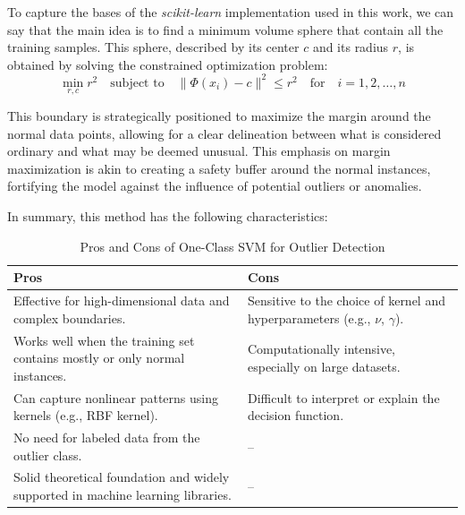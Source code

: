 \documentclass[11pt,english,a4paper,hidelinks]{book}
\begin{document}
\vspace{0.5cm}
\noindent To capture the bases of the \textit{scikit-learn} implementation \cite{scikit2025oneclasssvm} used in this work, we can say that the main idea is to find a minimum volume sphere that contain all the training samples. This sphere, described by its center \(c\) and its radius \(r\), is obtained by solving the constrained optimization problem: \cite{zineb2012simple}
\begin{equation}
\min_{r,c} r^2 \quad \text{subject to} \quad \|\Phi(x_i) - c\|^2 \leq r^2 \quad \text{for} \quad i = 1, 2, \ldots, n
\end{equation}

\vspace{0.5cm}
\noindent This boundary is strategically positioned to maximize the margin around the normal data points, allowing for a clear delineation between what is considered ordinary and what may be deemed unusual. This emphasis on margin maximization is akin to creating a safety buffer around the normal instances, fortifying the model against the influence of potential outliers or anomalies.

\vspace{0.5cm}
\noindent In summary, this method has the following characteristics:

\begin{table}[H]
    \centering
    \begin{tabular}{|p{7cm}|p{7cm}|}
        \hline
        \textbf{Pros} & \textbf{Cons} \\
            \hline
            Effective for high-dimensional data and complex boundaries. & Sensitive to the choice of kernel and hyperparameters (e.g., $\nu$, $\gamma$). \\
            \hline
            Works well when the training set contains mostly or only normal instances. & Computationally intensive, especially on large datasets. \\
            \hline
            Can capture nonlinear patterns using kernels (e.g., RBF kernel). & Difficult to interpret or explain the decision function. \\
            \hline
            No need for labeled data from the outlier class. & -- \\
            \hline
            Solid theoretical foundation and widely supported in machine learning libraries. & -- \\
        \hline
    \end{tabular}
    \caption{Pros and Cons of One-Class SVM for Outlier Detection}
\end{table}
    
\end{document}
